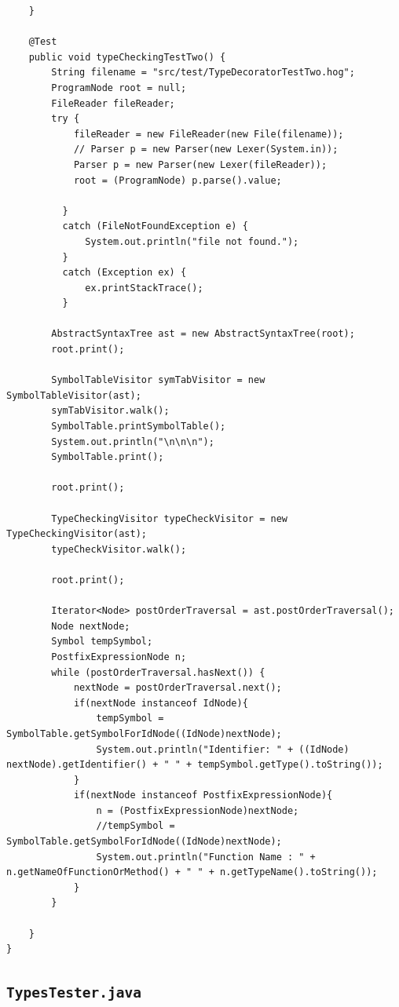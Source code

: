 \documentclass{report}
\begin{document}
\begin{verbatim}
	}
	
	@Test
	public void typeCheckingTestTwo() {
		String filename = "src/test/TypeDecoratorTestTwo.hog";
		ProgramNode root = null;
		FileReader fileReader;
	    try {
			fileReader = new FileReader(new File(filename));
	        // Parser p = new Parser(new Lexer(System.in));
	    	Parser p = new Parser(new Lexer(fileReader));
	    	root = (ProgramNode) p.parse().value;
	    	
	      }
	      catch (FileNotFoundException e) {
	    	  System.out.println("file not found.");
	      }
	      catch (Exception ex) {
	    	  ex.printStackTrace();
	      }
	    
	    AbstractSyntaxTree ast = new AbstractSyntaxTree(root);
	    root.print();
	    
	    SymbolTableVisitor symTabVisitor = new SymbolTableVisitor(ast);
	    symTabVisitor.walk();
	    SymbolTable.printSymbolTable();
	    System.out.println("\n\n\n");
	    SymbolTable.print();
	    
	    root.print();
	    
	    TypeCheckingVisitor typeCheckVisitor = new TypeCheckingVisitor(ast);
	    typeCheckVisitor.walk();
	    
	    root.print();
	    
		Iterator<Node> postOrderTraversal = ast.postOrderTraversal();
		Node nextNode;
		Symbol tempSymbol;
		PostfixExpressionNode n;
		while (postOrderTraversal.hasNext()) {
			nextNode = postOrderTraversal.next(); 
			if(nextNode instanceof IdNode){
				tempSymbol = SymbolTable.getSymbolForIdNode((IdNode)nextNode);
				System.out.println("Identifier: " + ((IdNode) nextNode).getIdentifier() + " " + tempSymbol.getType().toString());
			}
			if(nextNode instanceof PostfixExpressionNode){
				n = (PostfixExpressionNode)nextNode;
				//tempSymbol = SymbolTable.getSymbolForIdNode((IdNode)nextNode);
				System.out.println("Function Name : " + n.getNameOfFunctionOrMethod() + " " + n.getTypeName().toString());
			}
		}

	}
}

\end{verbatim}

\subsection{\texttt{TypesTester.java}}
\end{document}
